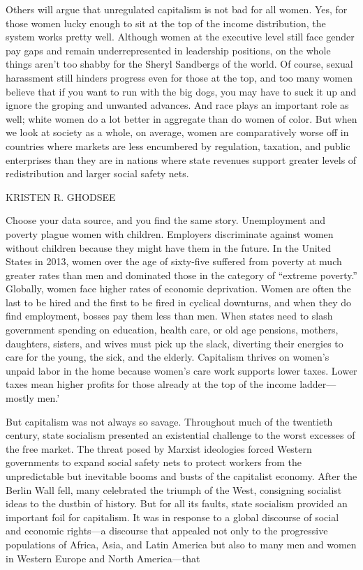 Others will argue that unregulated capitalism is not bad for all women. Yes, for those women lucky enough to sit at the top of the income distribution, the system works pretty well. Although women at the executive level still face gender pay gaps and remain underrepresented in leadership positions, on the whole things aren't too shabby for the Sheryl Sandbergs of the world. Of course, sexual harassment still hinders progress even for those at the top, and too many women believe that if you want to run with the big dogs, you may have to suck it up and ignore the groping and unwanted advances. And race plays an important role as well; white women do a lot better in aggregate than do women of color. But when we look at society as a whole, on average, women are comparatively worse off in countries where markets are less encumbered by regulation, taxation, and public enterprises than they are in nations where state revenues support greater levels of redistribution and larger social safety nets.
 \par 
KRISTEN R. GHODSEE
 \par 
Choose your data source, and you find the same story. Unemployment and poverty plague women with children. Employers discriminate against women without children because they might have them in the future. In the United States in 2013, women over the age of sixty-five suffered from poverty at much greater rates than men and dominated those in the category of “extreme poverty.” Globally, women face higher rates of economic deprivation. Women are often the last to be hired and the first to be fired in cyclical downturns, and when they do find employment, bosses pay them less than men. When states need to slash government spending on education, health care, or old age pensions, mothers, daughters, sisters, and wives must pick up the slack, diverting their energies to care for the young, the sick, and the elderly. Capitalism thrives on women’s unpaid labor in the home because women’s care work supports lower taxes. Lower taxes mean higher profits for those already at the top of the income ladder—mostly men.'
 \par 
But capitalism was not always so savage. Throughout much of the twentieth century, state socialism presented an existential challenge to the worst excesses of the free market. The threat posed by Marxist ideologies forced Western governments to expand social safety nets to protect workers from the unpredictable but inevitable booms and busts of the capitalist economy. After the Berlin Wall fell, many celebrated the triumph of the West, consigning socialist ideas to the dustbin of history. But for all its faults, state socialism provided an important foil for capitalism. It was in response to a global discourse of social and economic rights—a discourse that appealed not only to the progressive populations of Africa, Asia, and Latin America but also to many men and women in Western Europe and North America—that
